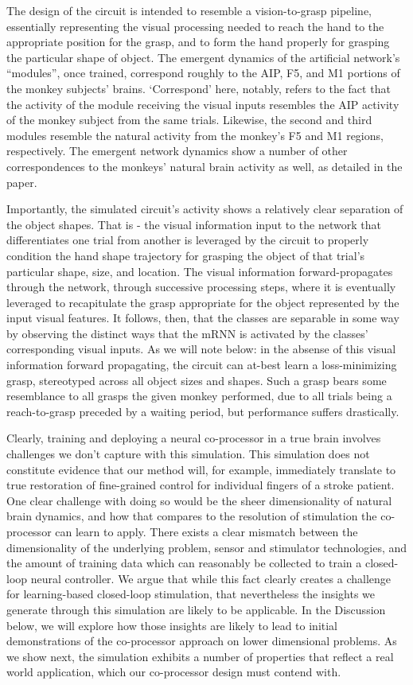 \documentclass[12pt]{iopart}
\begin{document}
The design of the circuit is intended to resemble a vision-to-grasp pipeline, essentially
representing the visual processing needed to reach the hand to the appropriate position for
the grasp, and to form the hand properly for grasping the particular shape of object. The
emergent dynamics of the artificial network's ``modules'', once trained, correspond roughly
to the AIP, F5, and M1 portions of the monkey subjects' brains. `Correspond' here, notably,
refers to the fact that the activity of the module receiving the visual inputs resembles
the AIP activity of the monkey subject from the same trials. Likewise, the second and
third modules resemble the natural activity from the monkey's F5 and M1 regions, respectively.
The emergent network dynamics show a number of other correspondences to the monkeys' natural
brain activity as well, as detailed in the paper.

Importantly, the simulated circuit's activity shows a relatively clear separation of the
object shapes. That is - the visual information input to the network that differentiates
one trial from another is leveraged by the circuit to properly condition
the hand shape trajectory for grasping the object of that trial's particular shape, size, and
location. The visual information forward-propagates through the network, through successive
processing steps, where it is eventually leveraged to recapitulate the grasp appropriate
for the object represented by the input visual features. It follows, then, that the classes
are separable in some way by observing the distinct ways that the mRNN is activated by the
classes' corresponding visual inputs. As we will note below: in the absense of this
visual information forward propagating, the circuit can at-best learn a loss-minimizing grasp,
stereotyped across all object sizes and shapes. Such a grasp bears some resemblance to all
grasps the given monkey performed, due to all trials being a reach-to-grasp preceded by a
waiting period, but performance suffers drastically.

Clearly, training and deploying a neural co-processor in a true brain involves challenges we
don't capture with this simulation. This simulation does not constitute evidence
that our method will, for example, immediately translate to true restoration of fine-grained
control for individual fingers of a stroke patient. One clear challenge with doing so would
be the sheer dimensionality of natural brain dynamics, and how that compares to the resolution
of stimulation the co-processor can learn to apply. There exists a clear mismatch between
the dimensionality of the underlying problem, sensor and stimulator technologies, and the
amount of training data which can reasonably be collected to train a closed-loop neural
controller. We argue that while this fact clearly creates a challenge for learning-based
closed-loop stimulation, that nevertheless the insights we generate through this
simulation are likely to be applicable. In the Discussion below, we will explore how
those insights are likely to lead to initial demonstrations of the co-processor approach
on lower dimensional problems. As we show next, the simulation exhibits a number of
properties that reflect a real world application, which our co-processor design must
contend with.
\end{document}
